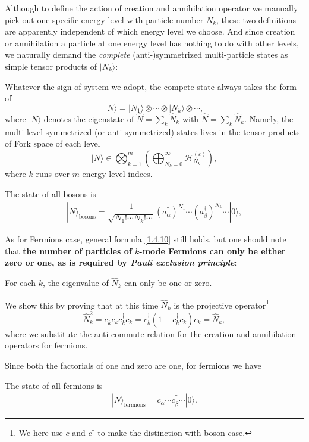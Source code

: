 \documentclass[b5paper,10pt,UTF8]{book}
\numberwithin{equation}{section}
\begin{document}
		Although to define the action of creation and annihilation operator we manually pick out one specific energy level with particle number $N_k$, these two definitions are apparently independent of which energy level we choose. And since creation or annihilation a particle at one energy level has nothing to do with other levels, we naturally demand the \emph{complete} (anti-)symmetrized multi-particle states as simple tensor products of $|N_k\rangle$:
		\begin{Assertion}
			Whatever the sign of system we adopt, the compete state always takes the form of
			\begin{equation}\label{1.4.10}
				|N\rangle=|N_1\rangle\otimes\cdots\otimes|N_k\rangle\otimes\cdots\nonumber,
			\end{equation}
			where $|N\rangle$ denotes the eigenstate of $\hat{N}=\sum_k\hat{N}_k$ with $\hat{N}=\sum_k \hat{N}_k$. Namely, the multi-level symmetrized (or anti-symmetrized) states lives in the tensor products of Fork space of each level
			$$|N\rangle\in\bigotimes_{k=1}^m\left(\bigoplus_{N_k=0}^\infty\mathcal{H}_{N_k}^{(\varepsilon)}\right),$$
			where $k$ runs over $m$ energy level indces.
		\end{Assertion}
		\begin{Corollary}
			The state of all bosons is
			\begin{align}
				|N\rangle_{\text{bosons}}=\dfrac{1}{\sqrt{N_1!\cdots N_k!\cdots}}(a^\dagger_\alpha)^{N_1}\cdots(a^\dagger_\beta)^{N_k}\cdots|0\rangle,\label{1.4.7}
			\end{align}
		\end{Corollary}
		As for Fermions case, general formula \eqref{1.4.10} still holds, but one should note that \textbf{the number of particles of $k$-mode Fermions can only be either zero or one, as is required by \emph{Pauli exclusion principle}}:
		\begin{Lemma}
			For each $k$, the eigenvalue of $\hat{N}_k$ can only be one or zero.
		\end{Lemma}
		\begin{Proof}
			We show this by proving that at this time $\hat{N}_k$ is the projective operator\footnote{We here use $c$ and $c^\dagger$ to make the distinction with boson case.}
			$$\hat{N}_k^2=c_k^\dagger c_k c_k^\dagger c_k=c_k^\dagger(1-c_k^\dagger c_k)c_k=\hat{N}_k,$$
			where we substitute the anti-commute relation for the creation and annihilation operators for fermions.
		\end{Proof}
		Since both the factorials of one and zero are one, for fermions we have
		\begin{Corollary}
			The state of all fermions is
			\begin{align}
				|N\rangle_{\text{fermions}}=c^\dagger_\alpha\cdots c^\dagger_\beta\cdots|0\rangle.\label{1.4.8}
			\end{align}
		\end{Corollary}
	
\end{document}
